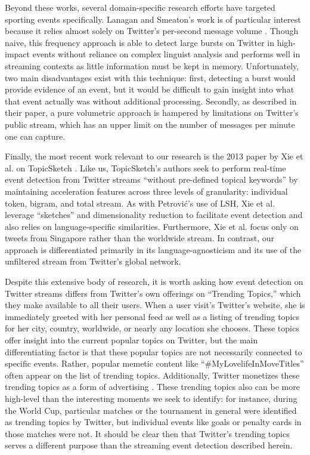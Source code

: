 \documentclass[letterpaper]{article}
\begin{document}
Beyond these works, several domain-specific research efforts have targeted sporting events specifically\cite{vasudevan2013twitter,Zhao2011,lanagan2011using}.
Lanagan and Smeaton's work is of particular interest because it relies almost solely on Twitter's per-second message volume \cite{lanagan2011using}.
Though naive, this frequency approach is able to detect large bursts on Twitter in high-impact events  without reliance on complex linguist analysis and performs well in streaming contexts as little information must be kept in memory.
Unfortunately, two main disadvantages exist with this technique: first, detecting a burst would provide evidence of an event, but it would be difficult to gain insight into what that event actually was without additional processing.
Secondly, as described in their paper, a pure volumetric approach is hampered by limitations on Twitter's public stream, which has an upper limit on the number of messages per minute one can capture.

Finally, the most recent work relevant to our research is the 2013 paper by Xie et al. on TopicSketch \cite{xie2013topicsketch}.
Like us, TopicSketch's authors seek to perform real-time event detection from Twitter streams ``without pre-defined topical keywords'' by maintaining acceleration features across three levels of granularity: individual token, bigram, and total stream.
As with Petrovi\'{c}'s use of LSH, Xie et al. leverage ``sketches'' and dimensionality reduction to facilitate event detection and also relies on language-specific similarities.
Furthermore, Xie et al. focus only on tweets from Singapore rather than the worldwide stream.
In contrast, our approach is differentiated primarily in its language-agnosticism and its use of the unfiltered stream from Twitter's global network.

Despite this extensive body of research, it is worth asking how event detection on Twitter streams differs from Twitter's own offerings on ``Trending Topics,'' which they make available to all their users.
When a user visit's Twitter's website, she is immediately greeted with her personal feed as well as a listing of trending topics for her city, country, worldwide, or nearly any location she chooses.
These topics offer insight into the current popular topics on Twitter, but the main differentiating factor is that these popular topics are not necessarily connected to specific events.
Rather, popular memetic content like ``\#MyLovelifeInMoveTitles'' often appear on the list of trending topics.
Additionally, Twitter monetizes these trending topics as a form of advertising \cite{Sydell2011}.  
These trending topics also can be more high-level than the interesting moments we seek to identify: for instance, during the World Cup, particular matches or the tournament in general were identified as trending topics by Twitter, but individual events like goals or penalty cards in those matches were not.
It should be clear then that Twitter's trending topics serves a different purpose than the streaming event detection described herein.
\end{document}
